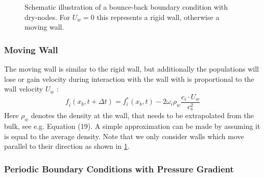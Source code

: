 \begin{figure}[ht!]
    \centering
    \caption[Schematic illustration of a bounce-back boundary condition with dry-nodes]{Schematic illustration of a bounce-back boundary condition with dry-nodes. For $U_w=0$ this represents a rigid wall, otherwise a moving wall.}
    \label{fig:boundary:bounce-back}
\end{figure}

\subsubsection{Moving Wall}

The moving wall is similar to the rigid wall, but additionally the populations will lose or gain velocity during interaction with the wall with is proportional to the wall velocity $U_w$ \cite{timm2016lattice}:
\begin{equation}
    f_{\overline{i}}(x_b,t+\Delta t) = f_i^*(x_b,t) - 2\omega_i\rho_w \frac{c_i \cdot U_w}{c_s^2}
    \label{eq:boundary:moving}
\end{equation}
Here $\rho_w$ denotes the density at the wall, that needs to be extrapolated from the bulk, see e.g. \cite{zou1997} Equation (19). A simple approximation can be made by assuming it is equal to the average density. Note that we only consider walls which move parallel to their direction as shown in \cref{fig:boundary:bounce-back}.

\subsubsection{Periodic Boundary Conditions with Pressure Gradient}

